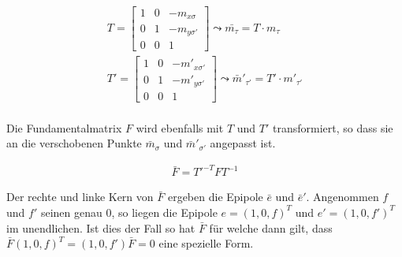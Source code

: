 
\begin{gather}
	T = \begin{bmatrix}
	1&0&-m_{x\sigma}\\
	0&1&-m_{y\sigma'}\\
	0&0&1
	\end{bmatrix} \leadsto \bar{m_\tau} = T\cdot m_\tau\\
	T' = \begin{bmatrix}
	1&0&-m'_{x\sigma'}\\
	0&1&-m'_{y\sigma'}\\
	0&0&1
	\end{bmatrix} \leadsto 	\bar{m}'_{\tau'} = T' \cdot m'_{\tau'}
\end{gather} \\

Die Fundamentalmatrix $F$ wird ebenfalls mit $T$ und $T'$ transformiert, so dass sie an die verschobenen Punkte $\bar{m}_{\sigma}$ und $\bar{m}'_{\sigma'}$ angepasst ist.
%

\begin{gather}
	\bar{F}= T'^{-T}FT^{-1}
\end{gather}

Der rechte und linke Kern von $\bar{F}$ ergeben die Epipole $\bar{e}$ und $\bar{e}'$. Angenommen $f$ und $f'$ seinen genau 0, so liegen die Epipole $e = (1,0,f)^T$ und $e' = (1,0,f')^T$ im unendlichen. Ist dies der Fall so hat $\bar{F}$ für welche dann gilt, dass $\bar{F}(1,0,f)^T = (1,0,f')\bar{F}=0$ eine spezielle Form\cite{HZ}.




